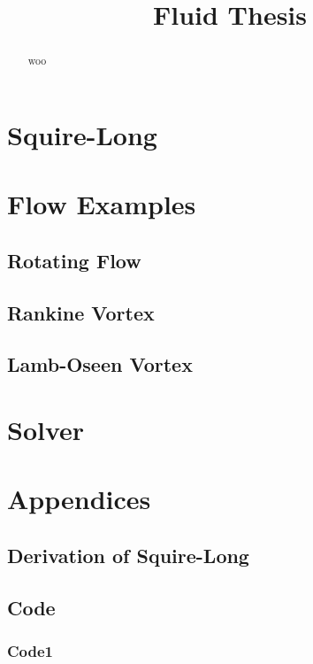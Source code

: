 \documentclass{X:/Documents/Coding/Latex/myreport}
\title{Fluid Thesis}
\begin{document}
\maketitle
\begin{abstract}
	woo
\end{abstract}

\chapter{Squire-Long}
%

\chapter{Flow Examples}
\section{Rotating Flow}
\section{Rankine Vortex}
\section{Lamb-Oseen Vortex}

\chapter{Solver}

\chapter{Appendices}
\appendix
\section{Derivation of Squire-Long}
\section{Code}
\subsection{Code1}
\end{document}
